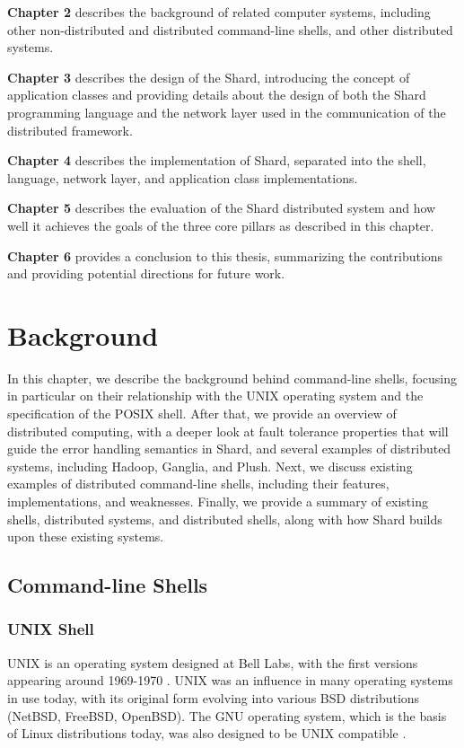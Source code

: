 \documentclass[oneside]{report}
\begin{document}
\begin{sloppypar}
  \textbf{Chapter 2} describes the background of related computer systems, including other non-distributed and distributed command-line shells, and other distributed systems.
\end{sloppypar}

\textbf{Chapter 3} describes the design of the Shard, introducing the concept of application classes and providing details about the design of both the Shard programming language and the network layer used in the communication of the distributed framework.

\textbf{Chapter 4} describes the implementation of Shard, separated into the shell, language, network layer, and application class implementations.

\textbf{Chapter 5} describes the evaluation of the Shard distributed system and how well it achieves the goals of the three core pillars as described in this chapter.

\textbf{Chapter 6} provides a conclusion to this thesis, summarizing the contributions and providing potential directions for future work.


\chapter{Background}

In this chapter, we describe the background behind command-line shells, focusing in particular on their relationship with the UNIX operating system and the specification of the POSIX shell.
After that, we provide an overview of distributed computing, with a deeper look at fault tolerance properties that will guide the error handling semantics in Shard, and several examples of distributed systems, including Hadoop, Ganglia, and Plush.
Next, we discuss existing examples of distributed command-line shells, including their features, implementations, and weaknesses.
Finally, we provide a summary of existing shells, distributed systems, and distributed shells, along with how Shard builds upon these existing systems.

\section{Command-line Shells}
\subsection{UNIX Shell}
UNIX is an operating system designed at Bell Labs, with the first versions appearing around 1969-1970 \cite{10.1145/361011.361061}.
UNIX was an influence in many operating systems in use today, with its original form evolving into various BSD distributions (NetBSD, FreeBSD, OpenBSD). The GNU operating system, which is the basis of Linux distributions today, was also designed to be UNIX compatible \cite{bretthauer2001open}.
\end{document}

